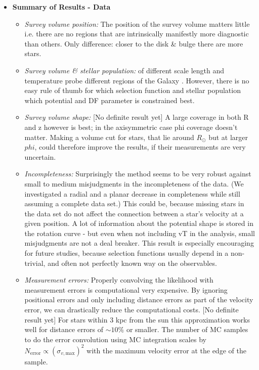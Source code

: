 \begin{itemize}
\item \textbf{Summary of Results - Data}

\begin{itemize}
\item \emph{Survey volume position:} The position of the survey volume matters little i.e. there are no regions that are intrinsically manifestly more diagnostic than others. Only difference: closer to the disk \& bulge there are more stars.
\item \emph{Survey volume \& stellar population:} \MAPs of different scale length and temperature probe different regions of the Galaxy \citep{bov13}. However, there is no easy rule of thumb for which selection function and stellar population which potential and DF parameter is constrained best.
\item \emph{Survey volume shape:} [No definite result yet] A large coverage in both R and z however is best; in the axisymmetric case phi coverage doesn't matter. Making a volume cut for stars, that lie around $R_\odot$ but at larger $phi$, could therefore improve the results, if their measurements are very uncertain.

\item \emph{Incompleteness:} Surprisingly the method seems to be very robust against small to medium misjudgments in the incompleteness of the data. (We investigated a radial and a planar decrease in completeness while still assuming a complete data set.) This could be, because missing stars in the data set do not affect the connection between a star's velocity at a given position. A lot of information about the potential shape is stored in the rotation curve - but even when not including vT in the analysis, small misjudgments are not a deal breaker. This result is especially encouraging for future studies, because selection functions usually depend in a non-trivial, and often not perfectly known way on the observables.

\item \emph{Measurement errors:} Properly convolving the likelihood with measurement errors is computational very expensive. By ignoring positional errors and only including distance errors as part of the velocity error, we can drastically reduce the computational costs. [No definite result yet] For stars within 3 kpc from the sun this approximation works well for distance errors of $\sim 10\%$ or smaller. The number of MC samples to do the error convolution using MC integration scales by $N_\text{error} \propto (\sigma_{v,\text{max}})^2$ with the maximum velocity error at the edge of the sample.
\end{itemize}


\end{itemize}
